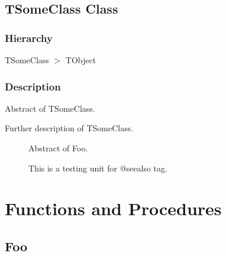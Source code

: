 \documentclass{report}
\newif\ifpdf
\begin{document}
\subsection*{TSomeClass Class}
\fi
\label{ok_see_also.TSomeClass}
\subsubsection*{\large{\textbf{Hierarchy}}\normalsize\hspace{1ex}\hfill}
TSomeClass {$>$} TObject
\subsubsection*{\large{\textbf{Description}}\normalsize\hspace{1ex}\hfill}
Abstract of TSomeClass.\hfill\vspace*{1ex}

 Further description of TSomeClass.  \begin{list}{}{
\setlength{\itemindent}{0cm}
\setlength{\listparindent}{0cm}
\setlength{\leftmargin}{\evensidemargin}
\addtolength{\leftmargin}{\tmplength}
\settowidth{\labelsep}{X}
\addtolength{\leftmargin}{\labelsep}
\setlength{\labelwidth}{\tmplength}
}
\item[\textbf{See also}]
\begin{description}
\item[\begin{ttfamily}Foo\end{ttfamily}(\ref{ok_see_also-Foo})] 
Abstract of Foo.
\item[\begin{ttfamily}ok{\_}see{\_}also unit\end{ttfamily}(\ref{ok_see_also})] 
This is a testing unit for @seealso tag.
\end{description}
\end{list}
\section{Functions and Procedures}
\ifpdf
\subsection*{\large{\textbf{Foo}}\normalsize\hspace{1ex}\hrulefill}
\else
\end{document}
